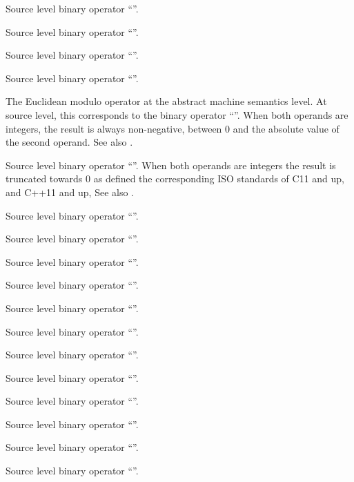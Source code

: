 Source level binary operator ``\code{+}''.

Source level binary operator ``\code{-}''.

Source level binary operator ``\code{*}''.

Source level binary operator ``\code{/}''.

The Euclidean modulo operator at the abstract machine semantics level.
At source level, this corresponds to the binary operator ``\code{\%}''.
When both operands are integers, the result is always non-negative, between $0$ and the absolute value of the second operand.
See also .

Source level binary operator ``\code{\%}''. 
When both operands are integers the result is truncated towards 0 as defined the corresponding ISO standards of C11 and up, and C++11 and up, 
See also .

Source level binary operator ``\code{\&}''.

Source level binary operator ``\code{|}''.

Source level binary operator ``\code{\^}''.

Source level binary operator ``\code{<<}''.

Source level binary operator ``\code{>>}''.

Source level binary operator ``\code{==}''.

Source level binary operator ``\code{!=}''.

Source level binary operator ``\code{<}''.

Source level binary operator ``\code{<=}''.

Source level binary operator ``\code{>}''.

Source level binary operator ``\code{>=}''.

Source level binary operator ``\code{<=>}''.

